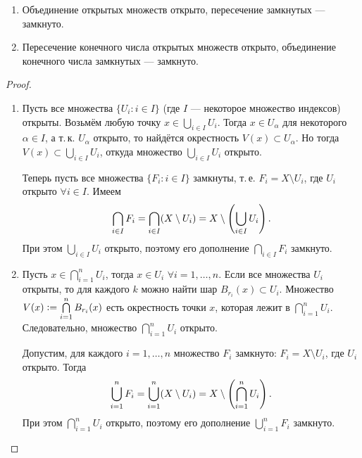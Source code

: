 \begin{theorem}
    \begin{enumerate}[nolistsep]
        \item Объединение открытых множеств открыто, пересечение замкнутых --- замкнуто.
        \item Пересечение конечного числа открытых множеств открыто, объединение конечного числа замкнутых --- замкнуто.
    \end{enumerate}
\end{theorem}

\begin{proof}
    \begin{enumerate}
        \item Пусть все множества $\{U_i : i \in I\}$ (где $I$ --- некоторое множество индексов) открыты. Возьмём любую точку $x \in \bigcup\limits_{i \in I}U_i$. Тогда $x \in U_\alpha$ для некоторого $\alpha \in I$, а т.\,к. $U_\alpha$ открыто, то найдётся окрестность $V(x) \subset U_\alpha$. Но тогда $V(x) \subset \bigcup\limits_{i \in I}U_i$, откуда множество $\bigcup\limits_{i \in I}U_i$ открыто.

            Теперь пусть все множества $\{F_i : i \in I\}$ замкнуты, т.\,е. $F_i = X \setminus U_i$, где $U_i$ открыто $\forall i \in I$. Имеем
            \[
                \bigcap_{i \in I}F_i = \bigcap_{i \in I}(X \setminus U_i) = X \setminus \left(\bigcup_{i \in I}U_i\right).
            \]
            При этом $\bigcup\limits_{i \in I}U_i$ открыто, поэтому его дополнение $\bigcap\limits_{i \in I}F_i$ замкнуто.
        \item Пусть $x \in \bigcap\limits_{i = 1}^nU_i$, тогда $x \in U_i$ $\forall i = 1, \ldots, n$. Если все множества $U_i$ открыты, то для каждого $k$ можно найти шар $B_{r_i}(x) \subset U_i$. Множество $V(x) \vcentcolon = \bigcap\limits_{i = 1}^nB_{r_i}(x)$ есть окрестность точки $x$, которая лежит в $\bigcap\limits_{i = 1}^nU_i$. Следовательно, множество $\bigcap\limits_{i = 1}^nU_i$ открыто.

            Допустим, для каждого $i = 1, \ldots, n$ множество $F_i$ замкнуто: $F_i = X \setminus U_i$, где $U_i$ открыто. Тогда
            \[
                \bigcup_{i = 1}^nF_i = \bigcup_{i = 1}^n(X \setminus U_i) = X \setminus \left(\bigcap_{i = 1}^nU_i\right).
            \]
            При этом $\bigcap\limits_{i = 1}^nU_i$ открыто, поэтому его дополнение $\bigcup\limits_{i = 1}^nF_i$ замкнуто.
    \end{enumerate}
\end{proof}

